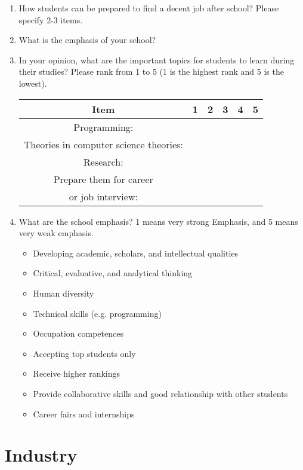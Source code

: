 \documentclass[12pt,a4paper,titlepage]{article}
\begin{document}
\begin{enumerate}
	\item How students can be prepared to find a decent job after school? Please specify 2-3 items.
	
	\item What is the emphasis of your school? 
	
	\item In your opinion, what are the important topics for students to learn during their studies? Please rank from 1 to 5 (1 is the highest rank and 5 is the lowest).
	\begin{table}[H]
 		\begin{tabular}{c r r r r r} 					        %
 		\hline\hline								%
 		Item   &  1  &  2  &  3  &  4  &  5\\
	 	\hline
 		Programming:\\
 	 	Theories in computer science theories:\\
 		Research:\\
 		Prepare them for career\\ or job interview:\\
 		\hline
 		\end{tabular}
 	\end{table}

	\item What are the school emphasis? 1 means very strong Emphasis, and 5 means very weak emphasis.
	\begin{itemize}
		\item Developing academic, scholars, and intellectual qualities
		\item Critical, evaluative, and analytical thinking
		\item Human diversity
		\item Technical skills (e.g. programming)
		\item Occupation competences
		\item Accepting top students only
		\item Receive higher rankings
		\item Provide collaborative skills and good relationship with other students
		\item Career fairs and internships
	\end{itemize}
	
\end{enumerate}

\section{Industry}
\end{document}
